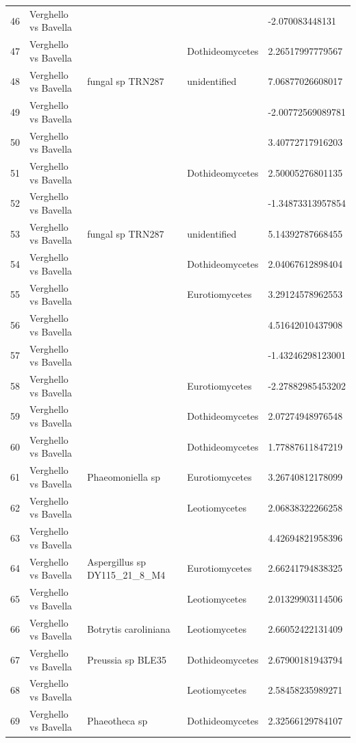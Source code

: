 \documentclass[12pt]{article}\usepackage[]{graphicx}\usepackage[]{color}
\numberwithin{figure}{section}
\begin{document}
\begin{table}[ht]
\begin{tabular}{lllll}
  46 & Verghello vs Bavella &  &  & -2.070083448131 \\ 
  47 & Verghello vs Bavella &  & Dothideomycetes & 2.26517997779567 \\ 
  48 & Verghello vs Bavella & fungal sp TRN287 & unidentified & 7.06877026608017 \\ 
  49 & Verghello vs Bavella &  &  & -2.00772569089781 \\ 
  50 & Verghello vs Bavella &  &  & 3.40772717916203 \\ 
  51 & Verghello vs Bavella &  & Dothideomycetes & 2.50005276801135 \\ 
  52 & Verghello vs Bavella &  &  & -1.34873313957854 \\ 
  53 & Verghello vs Bavella & fungal sp TRN287 & unidentified & 5.14392787668455 \\ 
  54 & Verghello vs Bavella &  & Dothideomycetes & 2.04067612898404 \\ 
  55 & Verghello vs Bavella &  & Eurotiomycetes & 3.29124578962553 \\ 
  56 & Verghello vs Bavella &  &  & 4.51642010437908 \\ 
  57 & Verghello vs Bavella &  &  & -1.43246298123001 \\ 
  58 & Verghello vs Bavella &  & Eurotiomycetes & -2.27882985453202 \\ 
  59 & Verghello vs Bavella &  & Dothideomycetes & 2.07274948976548 \\ 
  60 & Verghello vs Bavella &  & Dothideomycetes & 1.77887611847219 \\ 
  61 & Verghello vs Bavella & Phaeomoniella sp & Eurotiomycetes & 3.26740812178099 \\ 
  62 & Verghello vs Bavella &  & Leotiomycetes & 2.06838322266258 \\ 
  63 & Verghello vs Bavella &  &  & 4.42694821958396 \\ 
  64 & Verghello vs Bavella & Aspergillus sp DY115\_21\_8\_M4 & Eurotiomycetes & 2.66241794838325 \\ 
  65 & Verghello vs Bavella &  & Leotiomycetes & 2.01329903114506 \\ 
  66 & Verghello vs Bavella & Botrytis caroliniana & Leotiomycetes & 2.66052422131409 \\ 
  67 & Verghello vs Bavella & Preussia sp BLE35 & Dothideomycetes & 2.67900181943794 \\ 
  68 & Verghello vs Bavella &  & Leotiomycetes & 2.58458235989271 \\ 
  69 & Verghello vs Bavella & Phaeotheca sp & Dothideomycetes & 2.32566129784107 \\ 

\end{tabular}
\end{table}
\end{document}
